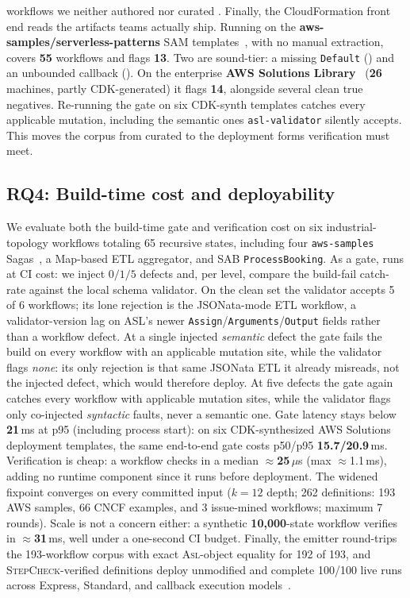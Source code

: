 workflows we neither authored nor curated \cite{stepcheck-repo}.
Finally, the CloudFormation front end reads the artifacts teams actually ship. Running \tool{} on the
\textbf{aws-samples/serverless-patterns} SAM templates~\cite{awsServerlessPatterns}, with no manual
extraction, covers \textbf{55} workflows and flags \textbf{13}. Two are sound-tier: a missing
\texttt{Default} () and an unbounded callback (). On the enterprise \textbf{AWS
Solutions Library}~\cite{awsSolutionsLibrary} (\textbf{26} machines, partly CDK-generated) it flags
\textbf{14}, alongside several clean true negatives. Re-running the gate on six CDK-synth templates
catches every applicable mutation, including the semantic ones \texttt{asl-validator} silently accepts.
This moves the corpus from curated \asl{} to the deployment forms verification must meet.

\subsection{RQ4: Build-time cost and deployability}
\label{sec:eval:cost}
\label{sec:eval:roundtrip}
\label{sec:eval:industrial}

We evaluate both the build-time gate and verification cost on six industrial-topology workflows
totaling 65 recursive states, including four \texttt{aws-samples} Sagas~\cite{awsServerlessPatterns},
a Map-based ETL aggregator, and SAB \texttt{ProcessBooking}. As a gate, \tool{} runs at CI cost: we inject $0/1/5$
defects and, per level, compare the build-fail catch-rate against the local schema validator. On the clean set the validator accepts 5 of 6 workflows; its lone
rejection is the JSONata-mode ETL workflow, a validator-version lag on ASL's newer
\texttt{Assign}/\texttt{Arguments}/\texttt{Output} fields rather than a workflow defect. At a single
injected \emph{semantic} defect the gate fails the build on every workflow with an applicable mutation site, while the
validator flags \emph{none}: its only rejection is that same JSONata ETL it already misreads, not the
injected defect, which would therefore deploy. At five defects the gate again catches every workflow with applicable mutation sites, while the
validator flags only co-injected \emph{syntactic} faults, never a semantic one. Gate latency stays
below \textbf{21}\,ms at p95 (including process start): on six CDK-synthesized AWS Solutions
deployment templates, the same end-to-end gate costs p50/p95 \textbf{15.7/20.9}\,ms.
Verification is cheap: a workflow checks in a median $\approx$\textbf{25}\,$\mu$s (max
$\approx$1.1\,ms), adding no runtime component since it runs before deployment. 
The widened fixpoint converges on every committed input
($k =12$ depth; 262 definitions: 193 AWS samples, 66 CNCF
examples, and 3 issue-mined workflows; maximum 7 rounds). Scale is not a
concern either: a synthetic
\textbf{10{,}000}-state workflow verifies in $\approx$\textbf{31}\,ms, well under a one-second CI budget.
Finally, the emitter round-trips the 193-workflow corpus with exact
\textsc{Asl}-object equality for 192 of 193, and \textsc{StepCheck}-verified
definitions deploy unmodified and complete 100/100 live runs across
Express, Standard, and callback execution models~\cite{stepcheck-repo}.


